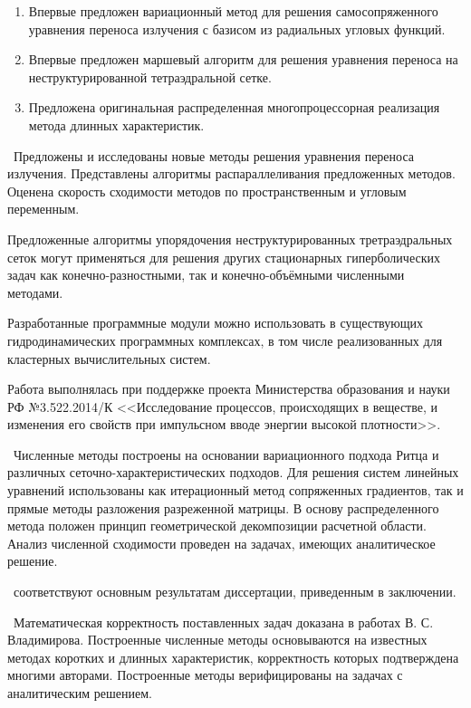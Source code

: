 \novelty
\begin{enumerate}
  \item Впервые предложен вариационный метод для решения самосопряженного уравнения переноса излучения с базисом из радиальных угловых функций.
  \item Впервые предложен маршевый алгоритм для решения уравнения переноса на неструктурированной тетраэдральной сетке.
  \item Предложена оригинальная распределенная многопроцессорная реализация метода длинных характеристик.
\end{enumerate}

\influence\ Предложены и исследованы новые методы решения уравнения переноса излучения. Представлены алгоритмы распараллеливания предложенных методов. Оценена скорость сходимости методов по пространственным и угловым переменным.

Предложенные алгоритмы упорядочения неструктурированных третраэдральных сеток могут применяться для решения других стационарных гиперболических задач как конечно-разностными, так и конечно-объёмными численными методами.

Разработанные программные модули можно использовать в существующих гидродинамических программных комплексах, в том числе реализованных для кластерных вычислительных систем.

Работа выполнялась при поддержке проекта Министерства образования и науки РФ №3.522.2014/К <<Исследование процессов, происходящих в веществе, и изменения его свойств при импульсном вводе энергии высокой плотности>>.

\methodology\ Численные методы построены на основании вариационного подхода Ритца и различных сеточно-характеристических подходов. Для решения систем линейных уравнений использованы как итерационный метод сопряженных градиентов, так и прямые методы разложения разреженной матрицы. 
В основу распределенного метода положен принцип геометрической декомпозиции расчетной области.
Анализ численной сходимости проведен на задачах, имеющих аналитическое решение.

\ соответствуют основным результатам диссертации, приведенным в заключении.

\probation\ Математическая корректность поставленных задач доказана в работах В. С. Владимирова. Построенные численные методы основываются на известных методах коротких и длинных характеристик, корректность которых подтверждена многими авторами. Построенные методы верифицированы на задачах с аналитическим решением.

